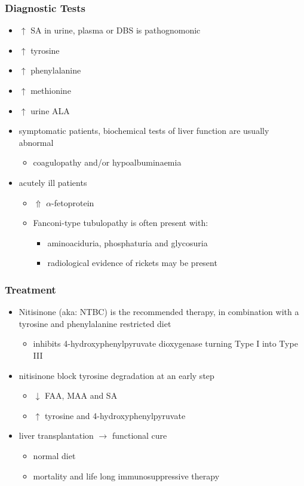 \documentclass{scrartcl}
\begin{document}
\subsubsection{Diagnostic Tests}
\label{sec:org11e9978}
\begin{itemize}
\item \(\uparrow\) SA in urine, plasma or DBS is pathognomonic
\item \(\uparrow\) tyrosine
\item \(\uparrow\) phenylalanine
\item \(\uparrow\) methionine
\item \(\uparrow\) urine ALA
\item symptomatic patients, biochemical tests of liver function are
usually abnormal
\begin{itemize}
\item coagulopathy and/or hypoalbuminaemia
\end{itemize}
\item acutely ill patients
\begin{itemize}
\item \(\Uparrow\) \(\alpha\)-fetoprotein
\item Fanconi-type tubulopathy is often present with:
\begin{itemize}
\item aminoaciduria, phosphaturia and glycosuria
\item radiological evidence of rickets may be present
\end{itemize}
\end{itemize}
\end{itemize}

\subsubsection{Treatment}
\label{sec:orgea65123}
\begin{itemize}
\item Nitisinone (aka: NTBC) is the recommended therapy, in combination
with a tyrosine and phenylalanine restricted diet
\begin{itemize}
\item inhibits 4-hydroxyphenylpyruvate dioxygenase turning Type I into Type III
\end{itemize}
\item nitisinone block tyrosine degradation at an early step
\begin{itemize}
\item \(\downarrow\) FAA, MAA and SA
\item \(\uparrow\) tyrosine and 4-hydroxyphenylpyruvate
\end{itemize}
\item liver transplantation \(\to\) functional cure
\begin{itemize}
\item normal diet
\item mortality and life long immunosuppressive therapy
\end{itemize}
\end{itemize}
\end{document}
